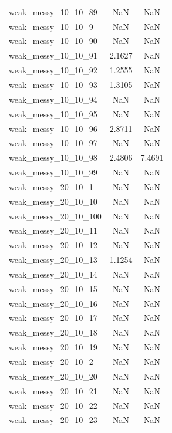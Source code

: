 \begin{longtable}{lcc}
weak\_messy\_10\_10\_89    &      NaN &     NaN \\
weak\_messy\_10\_10\_9     &      NaN &     NaN \\
weak\_messy\_10\_10\_90    &      NaN &     NaN \\
weak\_messy\_10\_10\_91    &   2.1627 &     NaN \\
weak\_messy\_10\_10\_92    &   1.2555 &     NaN \\
weak\_messy\_10\_10\_93    &   1.3105 &     NaN \\
weak\_messy\_10\_10\_94    &      NaN &     NaN \\
weak\_messy\_10\_10\_95    &      NaN &     NaN \\
weak\_messy\_10\_10\_96    &   2.8711 &     NaN \\
weak\_messy\_10\_10\_97    &      NaN &     NaN \\
weak\_messy\_10\_10\_98    &   2.4806 &  7.4691 \\
weak\_messy\_10\_10\_99    &      NaN &     NaN \\
weak\_messy\_20\_10\_1     &      NaN &     NaN \\
weak\_messy\_20\_10\_10    &      NaN &     NaN \\
weak\_messy\_20\_10\_100   &      NaN &     NaN \\
weak\_messy\_20\_10\_11    &      NaN &     NaN \\
weak\_messy\_20\_10\_12    &      NaN &     NaN \\
weak\_messy\_20\_10\_13    &   1.1254 &     NaN \\
weak\_messy\_20\_10\_14    &      NaN &     NaN \\
weak\_messy\_20\_10\_15    &      NaN &     NaN \\
weak\_messy\_20\_10\_16    &      NaN &     NaN \\
weak\_messy\_20\_10\_17    &      NaN &     NaN \\
weak\_messy\_20\_10\_18    &      NaN &     NaN \\
weak\_messy\_20\_10\_19    &      NaN &     NaN \\
weak\_messy\_20\_10\_2     &      NaN &     NaN \\
weak\_messy\_20\_10\_20    &      NaN &     NaN \\
weak\_messy\_20\_10\_21    &      NaN &     NaN \\
weak\_messy\_20\_10\_22    &      NaN &     NaN \\
weak\_messy\_20\_10\_23    &      NaN &     NaN \\

\end{longtable}

